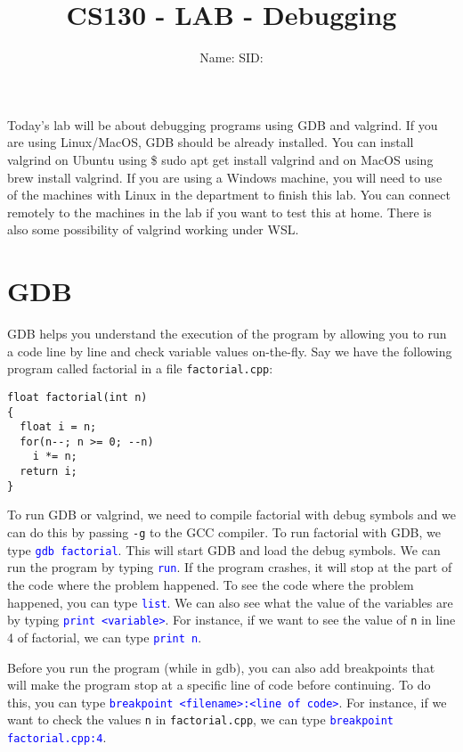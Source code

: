 \documentclass[12pt]{article}
\newcounter{problem}
\newcommand{\TODOL}[1]{\textcolor{red}{\underline{\hspace{#1 cm}}}}
\begin{document}
\title{CS130 - LAB - Debugging}
\date{}
\author{Name: \TODOL7\qquad\qquad SID: \TODOL4}
\maketitle
\begin{center}
\end{center}

\newcommand{\CM}[1]{\textcolor{blue}{\texttt{#1}}}

Today's lab will be about debugging programs using GDB and valgrind. If you are
using Linux/MacOS, GDB should be already installed. You can install valgrind on
Ubuntu using \$ sudo apt get install valgrind and on MacOS using brew install
valgrind. If you are using a Windows machine, you will need to use of the
machines with Linux in the department to finish this lab.  You can connect
remotely to the machines in the lab if you want to test this at home.  There is
also some possibility of valgrind working under WSL.

\section{GDB}

GDB helps you understand the execution of the program by allowing you to run a
code line by line and check variable values on-the-fly. Say we have the
following program called factorial in a file \texttt{factorial.cpp}:

\begin{lstlisting}
float factorial(int n)
{
  float i = n;
  for(n--; n >= 0; --n)
    i *= n;
  return i;
}
\end{lstlisting}

To run GDB or valgrind, we need to compile factorial with debug symbols and we
can do this by passing \texttt{-g} to the GCC compiler.  To run factorial with
GDB, we type \CM{gdb factorial}.  This will start GDB and load the debug symbols. We
can run the program by typing \CM{run}. If the program crashes, it will stop at the
part of the code where the problem happened. To see the code where the problem
happened, you can type \CM{list}. We can also see what the value of the variables are
by typing \CM{print <variable>}.  For instance, if we want to see the value
of \texttt{n} in line 4 of factorial, we can type \CM{print n}.

Before you run the program (while in gdb), you can also add breakpoints that will make the
program stop at a specific line of code before continuing.  To do this, you can
type \CM{breakpoint <filename>:<line of code>}. For instance, if we
want to check the values \texttt{n} in \texttt{factorial.cpp}, we can type
\CM{breakpoint factorial.cpp:4}.
\end{document}
